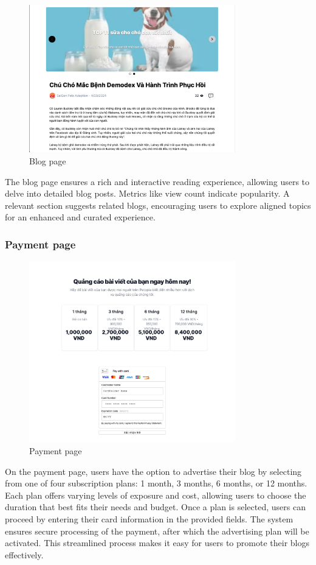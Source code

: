 \begin{figure}[H]
    \centering
    \includegraphics[width=0.8\textwidth]{Figures/UI/blog_page_ui.png}
    \caption{Blog page}
\end{figure}

The blog page ensures a rich and interactive reading experience, allowing users to delve into 
detailed blog posts. Metrics like view count indicate popularity. A relevant section suggests 
related blogs, encouraging users to explore aligned topics for an enhanced and curated experience.

\subsubsection{Payment page}
\begin{figure}[H]
    \centering
    \includegraphics[width=0.8\textwidth]{Figures/UI/payment_ui.png}
    \caption{Payment page}
\end{figure}
On the payment page, users have the option to advertise their blog by selecting from one of four subscription plans: 1 month, 3 months, 6 months, or 12 months. Each plan offers varying levels of exposure and cost, allowing users to choose the duration that best fits their needs and budget. Once a plan is selected, users can proceed by entering their card information in the provided fields. The system ensures secure processing of the payment, after which the advertising plan will be activated. This streamlined process makes it easy for users to promote their blogs effectively.

